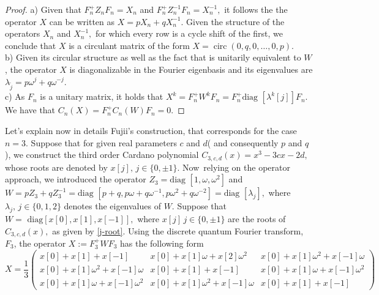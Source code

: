 \documentclass[11pt,reqno]{amsart}
\newcommand{\circM}{\operatorname{circ}}
\begin{document}
\begin{proof}
    a) Given that $F_n^+Z_nF_n=X_n$ and $F_n^+Z_n^{-1}F_n=X_n^{-1},$ it follows the the operator $X $ can be written as $X=pX_n+qX_n^{-1}$. Given the structure of the operators $X_n$ and $X_n^{-1},$ for which every row is a cycle shift of the first, we conclude that $X$ is a circulant matrix of the 
   form  $X=\circM(0,q,0,\ldots, 0,p)$.
\\b) Given its circular structure as well as the fact that is unitarily equivalent to $W$, the operator $X$ is diagonalizable in the Fourier eigenbasis and its eigenvalues are $\lambda_{\tilde{j}}=p\omega^{j}+q\omega^{-j}.$
\\c) As $F_n$ is a unitary matrix, it holds that $X^k=F_n^+W^kF_n=F_n^+ \text {diag }[\lambda^k[j]]F_n$. \\ We have that 
$C_n(X)=F_n^+C_n(W)F_n=0$.
\end{proof}
Let's explain now in details Fujii's construction\cite{Fujii2013}, that corresponds for the case $n=3$. Suppose that for given real parameters $c$ and $d$( and consequently $p$ and $q$), we construct the third order Cardano polynomial $C_{3,c,d}(x)=x^3-3cx-2d, $ whose roots are denoted by $x[j],\,j\in\{0,\pm1\}$.
Now\, relying on the operator approach, we introduced the operator $Z_3=\text {diag }[1, \omega, \omega^2]$ and   $W=pZ_3+qZ_3^{-1}=\text {diag }[p+q, p \omega +q \omega^{-1}, p\omega^2+q\omega^{-2}]=\text {diag }[\lambda_j],$ where $\lambda_j,\, j\in\{0,1,2\}$ denotes the eigenvalues of $W$. Suppose  that  $W=\text{ diag} [x[0],x[1],x[-1]],$ where $x[j]\, j\in\{0,\pm1\}$  are the roots of $C_{3,c,d}(x),$ as given by \eqref{j-root}. Using the discrete quantum Fourier transform, $F_3$,
the operator $X:=F_3^+WF_3$ has the following form \begin{equation}X=\frac{1}{3}\begin{pmatrix}
x[0]+x[1]+x[-1]&x[0]+x[1]\omega+x[2]\omega^2&x[0]+x[1]\omega^2+x[-1]\omega\\x[0]+x[1]\omega^2+x[-1] \omega &x[0]+x[1]+x[-1]&x[0]+x[1] \omega+x[-1] \omega^2\\
    x[0]+x[1] \omega+ x[-1] \omega^2&x[0]+x[1] \omega^2+x[-1]\omega& x[0]+x[1]+x[-1]
\end{pmatrix}\label{Fj}\end{equation} 
\end{document}

